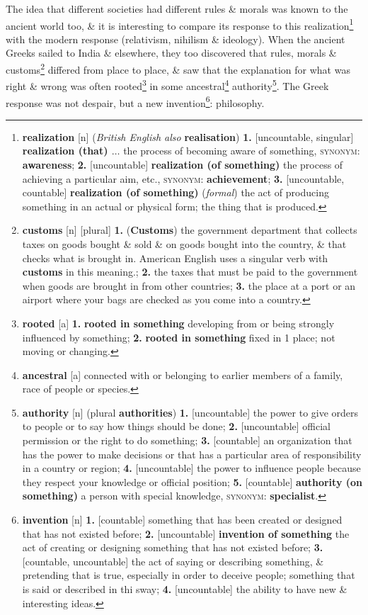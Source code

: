 \documentclass[oneside]{book}
\numberwithin{equation}{section}
\begin{document}
The idea that different societies had different rules \& morals was known to the ancient world too, \& it is interesting to compare its response to this realization\footnote{\textbf{realization} [n] (\textit{British English also} \textbf{realisation}) \textbf{1.} [uncountable, singular] \textbf{realization (that) $\ldots$} the process of becoming aware of something, \textsc{synonym}: \textbf{awareness}; \textbf{2.} [uncountable] \textbf{realization (of something)} the process of achieving a particular aim, etc., \textsc{synonym}: \textbf{achievement}; \textbf{3.} [uncountable, countable] \textbf{realization (of something)} (\textit{formal}) the act of producing something in an actual or physical form; the thing that is produced.} with the modern response (relativism, nihilism \& ideology). When the ancient Greeks sailed to India \& elsewhere, they too discovered that rules, morals \& customs\footnote{\textbf{customs} [n] [plural] \textbf{1.} (\textbf{Customs}) the government department that collects taxes on goods bought \& sold \& on goods bought into the country, \& that checks what is brought in. American English uses a singular verb with \textbf{customs} in this meaning.; \textbf{2.} the taxes that must be paid to the government when goods are brought in from other countries; \textbf{3.} the place at a port or an airport where your bags are checked as you come into a country.} differed from place to place, \& saw that the explanation for what was right \& wrong was often rooted\footnote{\textbf{rooted} [a] \textbf{1.} \textbf{rooted in something} developing from or being strongly influenced by something; \textbf{2.} \textbf{rooted in something} fixed in 1 place; not moving or changing.} in some ancestral\footnote{\textbf{ancestral} [a] connected with or belonging to earlier members of a family, race of people or species.} authority\footnote{\textbf{authority} [n] (plural \textbf{authorities}) \textbf{1.} [uncountable] the power to give orders to people or to say how things should be done; \textbf{2.} [uncountable] official permission or the right to do something; \textbf{3.} [countable] an organization that has the power to make decisions or that has a particular area of responsibility in a country or region; \textbf{4.} [uncountable] the power to influence people because they respect your knowledge or official position; \textbf{5.} [countable] \textbf{authority (on something)} a person with special knowledge, \textsc{synonym}: \textbf{specialist}.}. The Greek response was not despair, but a new invention\footnote{\textbf{invention} [n] \textbf{1.} [countable] something that has been created or designed that has not existed before; \textbf{2.} [uncountable] \textbf{invention of something} the act of creating or designing something that has not existed before; \textbf{3.} [countable, uncountable] the act of saying or describing something, \& pretending that is true, especially in order to deceive people; something that is said or described in thi sway; \textbf{4.} [uncountable] the ability to have new \& interesting ideas.}: philosophy.
\end{document}

